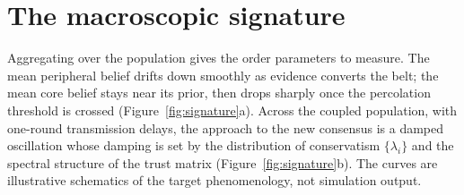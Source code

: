 \documentclass[11pt,a4paper]{article}
\begin{document}
\section{The macroscopic signature}

Aggregating over the population gives the order parameters to measure. The mean
peripheral belief drifts down smoothly as evidence converts the belt; the mean
core belief stays near its prior, then drops sharply once the percolation
threshold is crossed (Figure~\ref{fig:signature}a). Across the coupled
population, with one-round transmission delays, the approach to the new
consensus is a damped oscillation whose damping is set by the distribution of
conservatism $\{\lambda_i\}$ and the spectral structure of the trust matrix
(Figure~\ref{fig:signature}b). The curves are illustrative schematics of the
target phenomenology, not simulation output.
\end{document}
